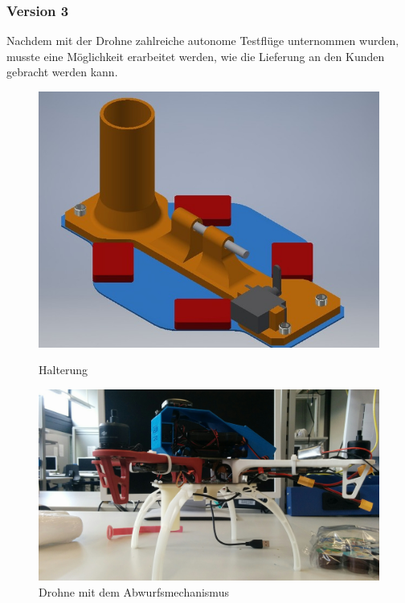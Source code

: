\subsubsection{Version 3}
Nachdem mit der Drohne zahlreiche autonome Testflüge unternommen wurden, musste eine Möglichkeit erarbeitet werden, wie die Lieferung an den Kunden gebracht werden kann.

\begin{figure}[H]
	\centering
	\begin{minipage}[b]{0.4\textwidth}
		\includegraphics[width=\textwidth]{images/hardware/parachute-model.jpg}
		\caption{Halterung}
		\label{fig:parachute-mode}
	\end{minipage}
	\hfill
	\begin{minipage}[b]{0.4\textwidth}
		\includegraphics[width=\textwidth]{images/hardware/drone-with-servo.jpg}
		\caption{Drohne mit dem Abwurfsmechanismus}
		\label{fig:drone-with-servo}
	\end{minipage}
\end{figure}


